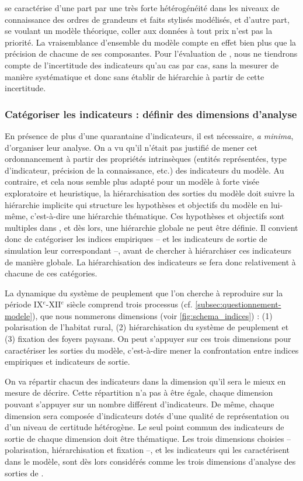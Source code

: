 \simfeodal{} se caractérise d'une part par une très forte hétérogénéité dans les niveaux de connaissance des ordres de grandeurs et faits stylisés modélisés, et d'autre part, se voulant un modèle théorique, \og coller aux données\fg{} à tout prix n'est pas la priorité.
La vraisemblance d'ensemble du modèle compte en effet bien plus que la précision de chacune de ses composantes.
Pour l'évaluation de \simfeodal{}, nous ne tiendrons compte de l'incertitude des indicateurs qu'au cas par cas, sans la mesurer de manière systématique et donc sans établir de hiérarchie à partir de cette incertitude.


\subsubsection{Catégoriser les indicateurs : définir des dimensions d'analyse}
En présence de plus d'une quarantaine d'indicateurs, il est nécessaire, \textit{a minima}, d'organiser leur analyse.
On a vu qu'il n'était pas justifié de mener cet ordonnancement à partir des propriétés intrinsèques (entités représentées, type d'indicateur, précision de la connaissance, etc.) des indicateurs du modèle.
Au contraire, et cela nous semble plus adapté pour un modèle à forte visée exploratoire et heuristique, la hiérarchisation des sorties du modèle doit suivre la hiérarchie implicite qui structure les hypothèses et objectifs du modèle en lui-même, c'est-à-dire une hiérarchie thématique.
Ces hypothèses et objectifs sont multiples dans \simfeodal{}, et dès lors, une hiérarchie globale ne peut être définie.
Il convient donc de catégoriser les indices empiriques -- et les indicateurs de sortie de simulation leur correspondant --, avant de chercher à hiérarchiser ces indicateurs de manière globale.
La hiérarchisation des indicateurs se fera donc relativement à chacune de ces catégories.

La dynamique du système de peuplement que l’on cherche à reproduire sur la période IX$^e$-XII$^e$ siècle comprend trois processus (cf. \cref{subsec:questionnement-modele}), que nous nommerons dimensions (voir \cref{fig:schema_indices}) :
(1) polarisation de l'habitat rural, (2) hiérarchisation du système de peuplement et (3) fixation des foyers paysans.
On peut s'appuyer sur ces trois dimensions pour caractériser les sorties du modèle, c'est-à-dire mener la confrontation entre indices empiriques et indicateurs de sortie.

On va répartir chacun des indicateurs dans la dimension qu'il sera le mieux en mesure de décrire.
Cette répartition n'a pas à être égale, chaque dimension pouvant s'appuyer sur un nombre différent d'indicateurs.
De même, chaque dimension sera composée d'indicateurs dotés d'une qualité de représentation ou d'un niveau de certitude hétérogène.
Le seul point commun des indicateurs de sortie de chaque dimension doit être thématique.
Les trois dimensions choisies -- polarisation, hiérarchisation et fixation --, et les indicateurs qui les caractérisent dans le modèle, sont dès lors considérés comme les trois dimensions d'analyse des sorties de \simfeodal{}.

